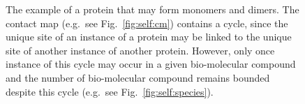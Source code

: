 \documentclass{entcs}
\begin{document}
\begin{figure}
\caption{The example of a protein that may form monomers and dimers.
The contact map (e.g.~see Fig.~\ref{fig:self:cm}) contains a cycle, since the unique site of an instance of a  protein may be linked to the unique site of another instance of another protein. However, only once instance of this cycle may occur in a given bio-molecular compound and the number of bio-molecular compound remains bounded despite this cycle (e.g.~see Fig.~\ref{fig:self:species}).}
\end{figure}
\end{document}
